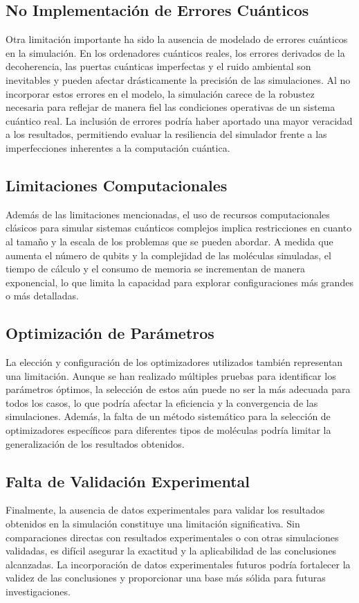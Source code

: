 \subsection{No Implementación de Errores Cuánticos}
Otra limitación importante ha sido la ausencia de modelado de errores cuánticos en la simulación. En los ordenadores cuánticos reales, los errores derivados de la decoherencia, las puertas cuánticas imperfectas y el ruido ambiental son inevitables y pueden afectar drásticamente la precisión de las simulaciones. Al no incorporar estos errores en el modelo, la simulación carece de la robustez necesaria para reflejar de manera fiel las condiciones operativas de un sistema cuántico real. La inclusión de errores podría haber aportado una mayor veracidad a los resultados, permitiendo evaluar la resiliencia del simulador frente a las imperfecciones inherentes a la computación cuántica.

\subsection{Limitaciones Computacionales}
Además de las limitaciones mencionadas, el uso de recursos computacionales clásicos para simular sistemas cuánticos complejos implica restricciones en cuanto al tamaño y la escala de los problemas que se pueden abordar. A medida que aumenta el número de qubits y la complejidad de las moléculas simuladas, el tiempo de cálculo y el consumo de memoria se incrementan de manera exponencial, lo que limita la capacidad para explorar configuraciones más grandes o más detalladas.

\subsection{Optimización de Parámetros}
La elección y configuración de los optimizadores utilizados también representan una limitación. Aunque se han realizado múltiples pruebas para identificar los parámetros óptimos, la selección de estos aún puede no ser la más adecuada para todos los casos, lo que podría afectar la eficiencia y la convergencia de las simulaciones. Además, la falta de un método sistemático para la selección de optimizadores específicos para diferentes tipos de moléculas podría limitar la generalización de los resultados obtenidos.

\subsection{Falta de Validación Experimental}
Finalmente, la ausencia de datos experimentales para validar los resultados obtenidos en la simulación constituye una limitación significativa. Sin comparaciones directas con resultados experimentales o con otras simulaciones validadas, es difícil asegurar la exactitud y la aplicabilidad de las conclusiones alcanzadas. La incorporación de datos experimentales futuros podría fortalecer la validez de las conclusiones y proporcionar una base más sólida para futuras investigaciones.

